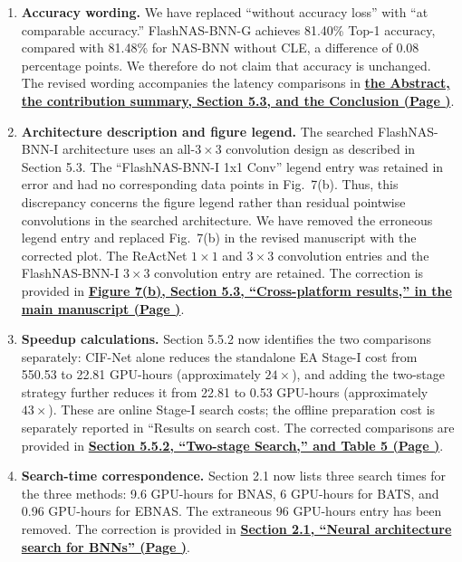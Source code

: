 \documentclass[11pt]{article}
\newcommand{\finishresponse}{\par\color{black}\vspace{5mm}}
\newcommand{\revloc}[1]{%
  \textcolor{revisionred}{\textbf{\uline{#1}}}}
\begin{document}
\begin{enumerate}[leftmargin=0pt,label={},itemsep=5mm]
\begin{enumerate}[label=(\alph*),leftmargin=2em,itemsep=2mm]
\item \textbf{Accuracy wording.} We have replaced ``without accuracy loss'' with ``at comparable accuracy.'' FlashNAS-BNN-G achieves 81.40\% Top-1 accuracy, compared with 81.48\% for NAS-BNN without CLE, a difference of 0.08 percentage points. We therefore do not claim that accuracy is unchanged. The revised wording accompanies the latency comparisons in \revloc{the Abstract, the contribution summary, Section 5.3, and the Conclusion (Page \underline{\hspace{1cm}})}.

\item \textbf{Architecture description and figure legend.} The searched FlashNAS-BNN-I architecture uses an all-$3\times3$ convolution design as described in Section 5.3. The ``FlashNAS-BNN-I 1x1 Conv'' legend entry was retained in error and had no corresponding data points in Fig.~7(b). Thus, this discrepancy concerns the figure legend rather than residual pointwise convolutions in the searched architecture. We have removed the erroneous legend entry and replaced Fig.~7(b) in the revised manuscript with the corrected plot. The ReActNet $1\times1$ and $3\times3$ convolution entries and the FlashNAS-BNN-I $3\times3$ convolution entry are retained. The correction is provided in \revloc{Figure 7(b), Section 5.3, ``Cross-platform results,'' in the main manuscript (Page \underline{\hspace{1cm}})}.

\item \textbf{Speedup calculations.} Section 5.5.2 now identifies the two comparisons separately: CIF-Net alone reduces the standalone EA Stage-I cost from 550.53 to 22.81 GPU-hours (approximately $24\times$), and adding the two-stage strategy further reduces it from 22.81 to 0.53 GPU-hours (approximately $43\times$). These are online Stage-I search costs; the offline preparation cost is separately reported in ``Results on search cost. The corrected comparisons are provided in \revloc{Section 5.5.2, ``Two-stage Search,'' and Table 5 (Page \underline{\hspace{1cm}})}.

\item \textbf{Search-time correspondence.} Section 2.1 now lists three search times for the three methods: 9.6 GPU-hours for BNAS, 6 GPU-hours for BATS, and 0.96 GPU-hours for EBNAS. The extraneous 96 GPU-hours entry has been removed. The correction is provided in \revloc{Section 2.1, ``Neural architecture search for BNNs'' (Page \underline{\hspace{1cm}})}.
\end{enumerate}
\par\endgroup
\finishresponse


\end{enumerate}
\end{document}
